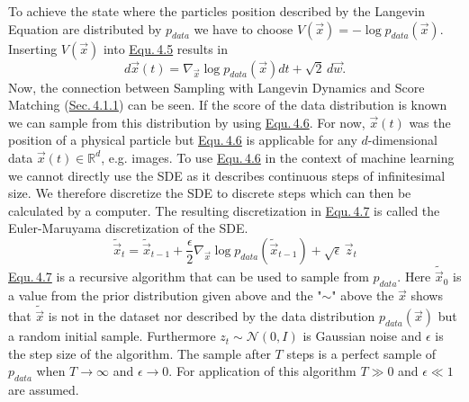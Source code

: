 To achieve the state where the particles position described by the Langevin Equation are distributed by $p_{data}$ we have to choose $V(\vec{x})=-\log p_{data}({\vec{x}})$. Inserting $V(\vec{x})$ into \hyperref[equ:4.5]{Equ.\,4.5} results in
%
\begin{equation} \label{equ:4.6}
    d\vec{x}(t)=\nabla_{\vec{x}}\log p_{data}(\vec{x})dt+\sqrt{2}\,d\vec{w}.
\end{equation}
%
Now, the connection between Sampling with Langevin Dynamics and Score Matching (\hyperref[sec:4.1.1]{Sec.\,4.1.1}) can be seen. If the score of the data distribution is known we can sample from this distribution by using \hyperref[equ:4.6]{Equ.\,4.6}. For now, $\vec{x}(t)$ was the position of a physical particle but \hyperref[equ:4.6]{Equ.\,4.6} is applicable for any $d$-dimensional data $\vec{x}(t)\in\mathbb{R}^d$, e.g. images. To use \hyperref[equ:4.6]{Equ.\,4.6} in the context of machine learning we cannot directly use the SDE as it describes continuous steps of infinitesimal size. We therefore discretize the SDE to discrete steps which can then be calculated by a computer. The resulting discretization in \hyperref[equ:4.7]{Equ.\,4.7} is called the Euler-Maruyama discretization of the SDE.
%
\begin{equation} \label{equ:4.7}
    \tilde{\vec{x}}_t=\tilde{\vec{x}}_{t-1}+\frac{\epsilon}{2}\nabla_{\vec{x}}\log p_{data}(\tilde{\vec{x}}_{t-1})+\sqrt{\epsilon}\,\vec{z}_t
\end{equation}
%
\hyperref[equ:4.7]{Equ.\,4.7} is a recursive algorithm that can be used to sample from $p_{data}$. Here $\tilde{\vec{x}}_0$ is a value from the prior distribution given above and the "$\sim$" above the $\vec{x}$ shows that $\tilde{\vec{x}}$ is not in the dataset nor described by the data distribution $p_{data}(\vec{x})$ but a random initial sample. Furthermore $z_t\sim\mathcal{N}(0, I)$ is Gaussian noise and $\epsilon$ is the step size of the algorithm. The sample after $T$ steps is a perfect sample of $p_{data}$ when $T\rightarrow\infty$ and $\epsilon\rightarrow0$. For application of this algorithm $T\gg0$ and $\epsilon\ll1$ are assumed.

